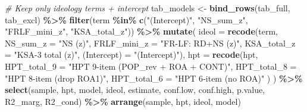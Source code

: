 \documentclass[
  10pt,
]{article}
\newenvironment{Shaded}{\begin{snugshade}}{\end{snugshade}}
\newcommand{\AttributeTok}[1]{\textcolor[rgb]{0.13,0.29,0.53}{#1}}
\newcommand{\CommentTok}[1]{\textcolor[rgb]{0.56,0.35,0.01}{\textit{#1}}}
\newcommand{\FunctionTok}[1]{\textcolor[rgb]{0.13,0.29,0.53}{\textbf{#1}}}
\newcommand{\NormalTok}[1]{#1}
\newcommand{\OtherTok}[1]{\textcolor[rgb]{0.56,0.35,0.01}{#1}}
\newcommand{\SpecialCharTok}[1]{\textcolor[rgb]{0.81,0.36,0.00}{\textbf{#1}}}
\newcommand{\StringTok}[1]{\textcolor[rgb]{0.31,0.60,0.02}{#1}}
\begin{document}
\begin{Shaded}
\begin{Highlighting}[]
\CommentTok{\# Keep only ideology terms + intercept}
\NormalTok{tab\_models }\OtherTok{\textless{}{-}} \FunctionTok{bind\_rows}\NormalTok{(tab\_full, tab\_excl) }\SpecialCharTok{\%\textgreater{}\%}
  \FunctionTok{filter}\NormalTok{(term }\SpecialCharTok{\%in\%} \FunctionTok{c}\NormalTok{(}\StringTok{"(Intercept)"}\NormalTok{, }\StringTok{"NS\_sum\_z"}\NormalTok{, }\StringTok{"FRLF\_mini\_z"}\NormalTok{, }\StringTok{"KSA\_total\_z"}\NormalTok{)) }\SpecialCharTok{\%\textgreater{}\%}
  \FunctionTok{mutate}\NormalTok{(}
    \AttributeTok{ideol =} \FunctionTok{recode}\NormalTok{(term, }\AttributeTok{NS\_sum\_z =} \StringTok{"NS (z)"}\NormalTok{, }\AttributeTok{FRLF\_mini\_z =} \StringTok{"FR{-}LF: RD+NS (z)"}\NormalTok{, }\AttributeTok{KSA\_total\_z =} \StringTok{"KSA{-}3 total (z)"}\NormalTok{, }\StringTok{\textasciigrave{}}\AttributeTok{(Intercept)}\StringTok{\textasciigrave{}} \OtherTok{=} \StringTok{"(Intercept)"}\NormalTok{),}
    \AttributeTok{hpt =} \FunctionTok{recode}\NormalTok{(hpt,}
      \AttributeTok{HPT\_total\_9 =} \StringTok{"HPT 9{-}item (POP\_rev + ROA + CONT)"}\NormalTok{,}
      \AttributeTok{HPT\_total\_8 =} \StringTok{"HPT 8{-}item (drop ROA1)"}\NormalTok{,}
      \AttributeTok{HPT\_total\_6 =} \StringTok{"HPT 6{-}item (no ROA)"}
\NormalTok{    )}
\NormalTok{  ) }\SpecialCharTok{\%\textgreater{}\%}
  \FunctionTok{select}\NormalTok{(sample, hpt, model, ideol, estimate, conf.low, conf.high, p.value, R2\_marg, R2\_cond) }\SpecialCharTok{\%\textgreater{}\%}
  \FunctionTok{arrange}\NormalTok{(sample, hpt, ideol, model)}


\end{Highlighting}
\end{Shaded}
\end{document}
